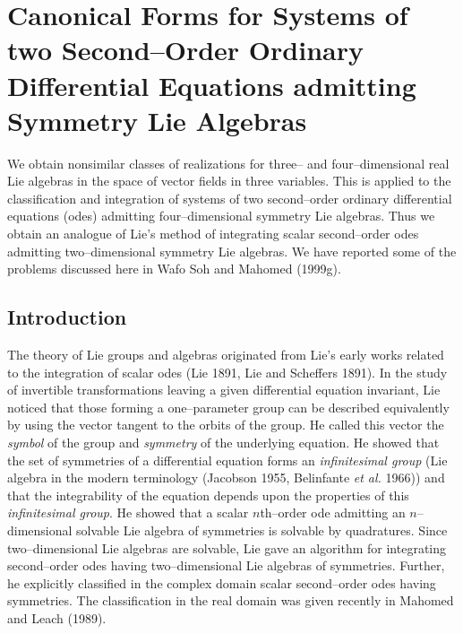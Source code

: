 %

\chapter{Canonical Forms for Systems of two Second--Order Ordinary
Differential Equations admitting  Symmetry Lie Algebras}

We obtain nonsimilar classes of realizations for 
three-- and four--dimensional real Lie algebras in the space of vector fields in
three variables. This is applied to the classification  and integration of
systems of two second--order ordinary differential equations (odes)
admitting  four--dimensional symmetry Lie algebras. Thus we obtain an
analogue of Lie's method of integrating  scalar second--order odes
admitting two--dimensional symmetry Lie algebras. We have reported some
of the problems discussed here in Wafo Soh and Mahomed (1999g).
\section{Introduction}

The theory of Lie groups and algebras originated from Lie's early works 
related to the integration of scalar odes (Lie 1891, Lie and Scheffers 1891).
In the
study of invertible transformations leaving a given differential equation
invariant, Lie noticed that those forming a one--parameter group can be
described equivalently by using the vector tangent to the orbits of the
group. He called this vector the {\em symbol} of the group and {\em
symmetry} of the underlying equation. He showed that the set of symmetries
of a differential equation forms an {\em infinitesimal group} (Lie algebra
in the modern terminology (Jacobson 1955, Belinfante {\em et al.} 1966))
and that the integrability of
the equation depends upon the properties of this {\em infinitesimal
group}. He showed that  a scalar $n$th--order ode admitting an
$n$--dimensional solvable Lie algebra of symmetries is solvable by
quadratures. Since two--dimensional Lie algebras are solvable, Lie gave an
algorithm for integrating second--order  odes having two--dimensional Lie
algebras of symmetries. Further, he explicitly classified in the complex domain
scalar  second--order odes having symmetries. The classification in the
real domain was given recently in Mahomed and Leach (1989).

